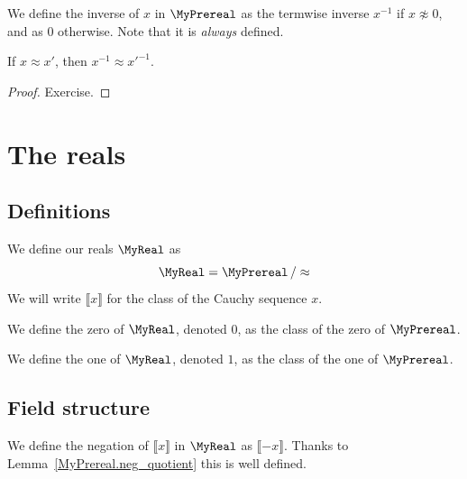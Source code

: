 \begin{definition}
    \label{MyPrereal.inv}
    \leanok
We define the inverse of $x$ in $\MyPrereal$ as the termwise inverse $x^{-1}$ if $x \not\approx 0$,
and as $0$ otherwise. Note that it is \emph{always} defined.
\end{definition}

\begin{lemma}
    \label{MyPrereal.inv_quotient}
    \leanok
If $x \approx x'$, then $x^{-1} \approx x'^{-1}$.
\end{lemma}
\begin{proof}
    \leanok
    Exercise.
\end{proof}

\section{The reals}

\subsection{Definitions}

\begin{definition}
    \label{MyReal}
    \leanok
    We define our reals $\MyReal$ as
\[
\MyReal = \MyPrereal \, / \approx
\]
We will write $⟦ x ⟧$ for the class of the Cauchy sequence $x$.
\end{definition}

\begin{definition}
    \label{MyReal.zero}
    \leanok
We define the zero of $\MyReal$, denoted $0$, as the class of the zero of $\MyPrereal$.
\end{definition}

\begin{definition}
    \label{MyReal.one}
    \leanok
We define the one of $\MyReal$, denoted $1$, as the class of the one of $\MyPrereal$.
\end{definition}

\subsection{Field structure}

\begin{definition}
    \label{MyReal.neg}
    \leanok
We define the negation of $⟦ x ⟧$ in $\MyReal$ as $⟦ -x ⟧$. Thanks to
Lemma~\ref{MyPrereal.neg_quotient} this is well defined.
\end{definition}

